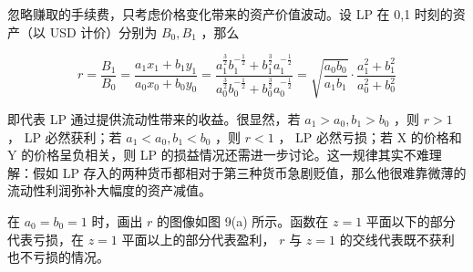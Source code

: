 \documentclass[12pt, a4paper, oneside]{ctexart}
\begin{document}
忽略赚取的手续费，只考虑价格变化带来的资产价值波动。设 LP 在 0,1 时刻的资产（以 USD 计价）分别为 $B_0,B_1$ ，那么

\begin{equation}
    r = \frac{B_1}{B_0} 
    = \frac{a_1x_1+b_1y_1}{a_0x_0+b_0y_0} 
    = \frac{a_1^{\frac{3}{2}}b_1^{-\frac{1}{2}} + b_1^{\frac{3}{2}}a_1^{-\frac{1}{2}}}{a_0^{\frac{3}{2}}b_0^{-\frac{1}{2}} + b_0^{\frac{3}{2}}a_0^{-\frac{1}{2}}} 
    = \sqrt{\frac{a_0b_0}{a_1b_1}} \cdot \frac{a_1^2+b_1^2}{a_0^2+b_0^2}
\end{equation}

\noindent 即代表 LP 通过提供流动性带来的收益。很显然，若 $a_1>a_0,b_1>b_0$ ，则 $r>1$ ， LP 必然获利；若 $a_1<a_0,b_1<b_0$ ，则 $r<1$ ， LP 必然亏损；若 X 的价格和 Y 的价格呈负相关，则 LP 的损益情况还需进一步讨论。这一规律其实不难理解：假如 LP 存入的两种货币都相对于第三种货币急剧贬值，那么他很难靠微薄的流动性利润弥补大幅度的资产减值。

在 $a_0=b_0=1$ 时，画出 $r$ 的图像如图 9(a) 所示。函数在 $z=1$ 平面以下的部分代表亏损，在 $z=1$ 平面以上的部分代表盈利， $r$ 与 $z=1$ 的交线代表既不获利也不亏损的情况。

\end{document}
